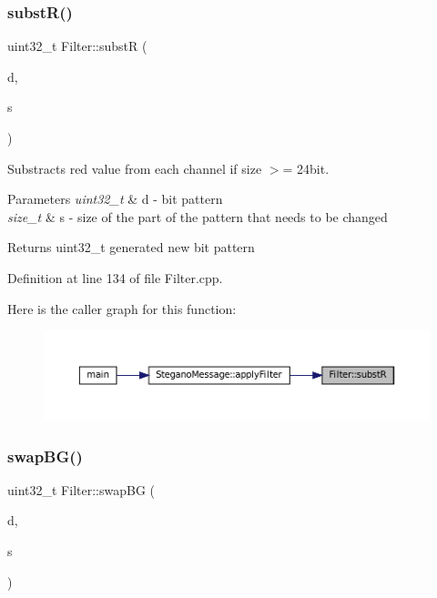 \subsubsection{\texorpdfstring{substR()}{substR()}}
{\footnotesize\ttfamily uint32\+\_\+t Filter\+::substR (\begin{DoxyParamCaption}\item[{uint32\+\_\+t}]{d,  }\item[{size\+\_\+t}]{s }\end{DoxyParamCaption})\hspace{0.3cm}{\ttfamily [static]}}



Substracts red value from each channel if size $>$= 24bit. 


\begin{DoxyParams}{Parameters}
{\em uint32\+\_\+t} & d -\/ bit pattern \\
\hline
{\em size\+\_\+t} & s -\/ size of the part of the pattern that needs to be changed \\
\hline
\end{DoxyParams}
\begin{DoxyReturn}{Returns}
uint32\+\_\+t generated new bit pattern 
\end{DoxyReturn}


Definition at line 134 of file Filter.\+cpp.

Here is the caller graph for this function\+:
\nopagebreak
\begin{figure}[H]
\begin{center}
\leavevmode
\includegraphics[width=350pt]{classFilter_a773ee633720080079d6a17ac610d353d_icgraph}
\end{center}
\end{figure}
\mbox{\label{classFilter_a68528a62dfbd9f78d6bd0703ca5bd828}} 
\subsubsection{\texorpdfstring{swapBG()}{swapBG()}}
{\footnotesize\ttfamily uint32\+\_\+t Filter\+::swap\+BG (\begin{DoxyParamCaption}\item[{uint32\+\_\+t}]{d,  }\item[{size\+\_\+t}]{s }\end{DoxyParamCaption})\hspace{0.3cm}{\ttfamily [static]}}




